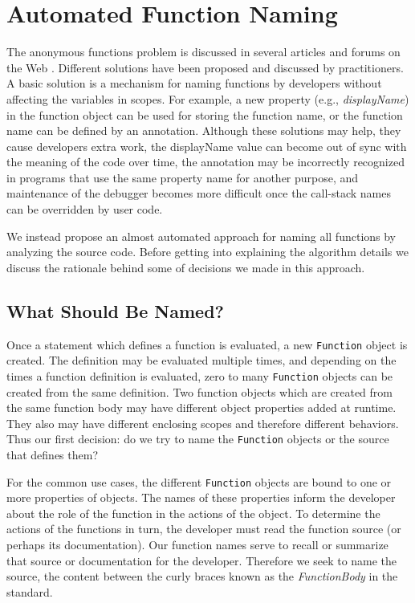 \documentclass[10pt, preprint]{sigplanconf}
\begin{document}
\section{Automated Function Naming}
The anonymous functions problem is discussed in several articles and forums on the Web \cite{DisplayName, Zaytsev}. Different solutions have been proposed and discussed by practitioners. A basic solution is a mechanism for naming functions by developers without affecting the variables in scopes. For example, a new property (e.g., \textit{displayName}) in the function object can be used for storing the function name, or the function name can be defined by an annotation. Although these solutions may help, they cause developers extra work, the displayName value can become out of sync with the meaning of the code over time,  the annotation may be incorrectly recognized in programs that use the same property name for another purpose, and maintenance of the debugger becomes more difficult once the call-stack names can be overridden by user code.

We instead propose an almost automated approach for naming all functions by analyzing the source code. Before getting into explaining the algorithm details we discuss the rationale behind some of decisions we made in this approach.

\subsection{What Should Be Named?}

Once a statement which defines a function is evaluated, a new {\small\texttt{Function}} 
object is created.  The definition may be evaluated multiple times, and depending on the times a function definition is evaluated, 
zero to many {\small\texttt{Function}} objects can be created from the same definition. 
Two function objects which are created from the same function body may have different object properties added at runtime. They also may have different enclosing scopes and therefore different behaviors.  Thus our first 
decision: do we try to name the {\small\texttt{Function}} objects or the source that defines them?

For the common use cases, the different {\small\texttt{Function}} objects are bound to one or more properties of objects. The  names of these properties inform the developer about the role of the function in the actions of the object.  To determine the actions of the functions in turn, the developer must read the function source (or perhaps its documentation). Our function names serve to recall or summarize that source or documentation for the developer. Therefore we seek to name the source, the content between the curly braces known as the {\textit{FunctionBody}} in the standard\cite{ECMA}.
\end{document}
